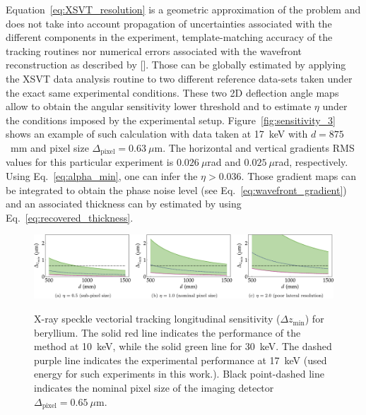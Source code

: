 \begin{refsection}
Equation~\ref{eq:XSVT_resolution} is a geometric approximation of the problem and does not take into account propagation of uncertainties associated with the different components in the experiment, template-matching accuracy of the tracking routines nor numerical errors associated with the wavefront reconstruction as described by [\cite{Fried1977, Southwell1980}]. Those can be globally estimated by applying the XSVT data analysis routine to two different reference data-sets taken under the exact same experimental conditions. These two 2D deflection angle maps allow to obtain the angular sensitivity lower threshold and to estimate $\eta$ under the conditions imposed by the experimental setup. Figure~\ref{fig:sensitivity_3} shows an example of such calculation with data taken at 17~keV with $d=875$~mm and pixel size $\Delta_\text{pixel}= 0.63~\mu$m. The horizontal and vertical gradients RMS values for this particular experiment is $0.026~\mu$rad and $0.025~\mu$rad, respectively. Using Eq.~\ref{eq:alpha_min}, one can infer the $\eta>0.036$. Those gradient maps can be integrated to obtain the phase noise level (see Eq.~\ref{eq:wavefront_gradient}) and an associated thickness can by estimated by using Eq.~\ref{eq:recovered_thickness}.

\begin{figure}[t]
        \centering
        {\includegraphics[width=1.0\linewidth]{figures/ch04b/sensitivity_2b.pdf}}
        \caption[XSVT sensitivity calculation]{X-ray speckle vectorial tracking longitudinal sensitivity ($\Delta{z_{\text{min}}}$) for beryllium. The solid red line indicates the performance of the method at 10~keV, while the solid green line for 30~keV. The dashed purple line indicates the experimental performance at 17~keV (used energy for such experiments in this work.). Black point-dashed line indicates the nominal pixel size of the imaging detector $\Delta_\text{pixel}=0.65~\mu$m.}\label{fig:sensitivity_2}
\end{figure}


\end{refsection}
